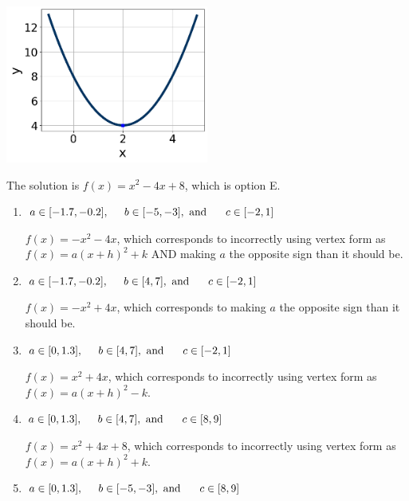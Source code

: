 \documentclass{extbook}[14pt]
\begin{document}
\begin{enumerate}
{\begin{center}
    \includegraphics[width=0.5\textwidth]{../Figures/quadraticGraphToEquationA.png}
\end{center}


The solution is \( f(x) = x^{2} -4 x + 8 \), which is option E.\begin{enumerate}[label=\Alph*.]
\item \( a \in [-1.7, -0.2], \hspace*{5mm} b \in [-5, -3], \text{ and } \hspace*{5mm} c \in [-2, 1] \)

$f(x)=-x^{2} -4 x$, which corresponds to incorrectly using vertex form as $f(x) = a(x+h)^2+k$ AND making $a$ the opposite sign than it should be.
\item \( a \in [-1.7, -0.2], \hspace*{5mm} b \in [4, 7], \text{ and } \hspace*{5mm} c \in [-2, 1] \)

$f(x)=-x^{2} +4 x$, which corresponds to making $a$ the opposite sign than it should be.
\item \( a \in [0, 1.3], \hspace*{5mm} b \in [4, 7], \text{ and } \hspace*{5mm} c \in [-2, 1] \)

$f(x)=x^{2} +4 x$, which corresponds to incorrectly using vertex form as $f(x) = a(x+h)^2 - k$.
\item \( a \in [0, 1.3], \hspace*{5mm} b \in [4, 7], \text{ and } \hspace*{5mm} c \in [8, 9] \)

$f(x)=x^{2} +4 x + 8$, which corresponds to incorrectly using vertex form as $f(x) = a(x+h)^2+k$.
\item \( a \in [0, 1.3], \hspace*{5mm} b \in [-5, -3], \text{ and } \hspace*{5mm} c \in [8, 9] \)


\end{enumerate}}
\end{enumerate}
\end{document}

